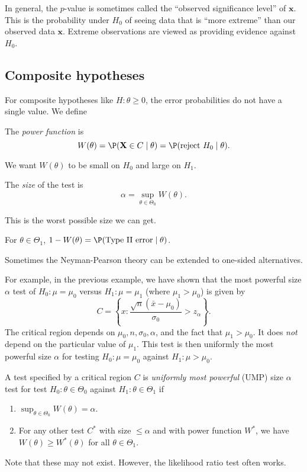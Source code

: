 \documentclass[a4paper]{article}
\begin{document}
In general, the $p$-value is sometimes called the ``observed significance level'' of $\mathbf{x}$. This is the probability under $H_0$ of seeing data that is ``more extreme'' than our observed data $\mathbf{x}$. Extreme observations are viewed as providing evidence against $H_0$.

\subsection{Composite hypotheses}
For composite hypotheses like $H:\theta \geq 0$, the error probabilities do not have a single value. We define
\begin{defi}
  The \emph{power function} is
  \[
    W(\theta) = \P(\mathbf{X}\in C\mid \theta) = \P(\text{reject }H_0\mid \theta).
  \]
\end{defi}
We want $W(\theta)$ to be small on $H_0$ and large on $H_1$.

\begin{defi}[Size]
  The \emph{size} of the test is
  \[
    \alpha =\sup_{\theta\in \Theta_0}W(\theta).
  \]
\end{defi}
This is the worst possible size we can get.

For $\theta\in \Theta_1$, $1 - W(\theta) = \P(\text{Type II error}\mid \theta)$.

Sometimes the Neyman-Pearson theory can be extended to one-sided alternatives.

For example, in the previous example, we have shown that the most powerful size $\alpha$ test of $H_0: \mu = \mu_0$ versus $H_1: \mu = \mu_1$ (where $\mu_1 > \mu_0$) is given by
\[
  C = \left\{x: \frac{\sqrt{n}(\bar x - \mu_0)}{\sigma_0} > z_\alpha\right\}.
\]
The critical region depends on $\mu_0, n, \sigma_0, \alpha$, and the fact that $\mu_1 > \mu_0$. It does \emph{not} depend on the particular value of $\mu_1$. This test is then uniformly the most powerful size $\alpha$ for testing $H_0: \mu = \mu_0$ against $H_1: \mu> \mu_0$.

\begin{defi}
  A test specified by a critical region $C$ is \emph{uniformly most powerful} (UMP) size $\alpha$ test for test $H_0:\theta\in \Theta_0$ against $H_1: \theta \in \Theta_1$ if
  \begin{enumerate}
    \item $\sup_{\theta\in \Theta_0} W(\theta) = \alpha$.
    \item For any other test $C^*$ with size $\leq \alpha$ and with power function $W^*$, we have $W(\theta) \geq W^*(\theta)$ for all $\theta\in \Theta_1$.
  \end{enumerate}
  Note that these may not exist. However, the likelihood ratio test often works.
\end{defi}
\end{document}
